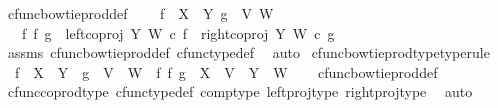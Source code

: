 \begin{isabellebody}
\isanewline
{}\isamarkupfalse%
\ cfunc{\isacharunderscore}{\kern0pt}bowtie{\isacharunderscore}{\kern0pt}prod{\isacharunderscore}{\kern0pt}def{}{\isacharcolon}{\kern0pt}\ \isanewline
\ \ \ {\isachardoublequoteopen}f\ {\isacharcolon}{\kern0pt}\ X\ {\isasymrightarrow}\ Y{\isachardoublequoteclose}\ {\isachardoublequoteopen}g\ {\isacharcolon}{\kern0pt}\ V{\isasymrightarrow}\ W{\isachardoublequoteclose}\isanewline
\ \ \ {\isachardoublequoteopen}f\ {\isasymbowtie}\isactrlsub f\ g\ {\isacharequal}{\kern0pt}\ {\isacharparenleft}{\kern0pt}left{\isacharunderscore}{\kern0pt}coproj\ Y\ W\ {\isasymcirc}\isactrlsub c\ f{\isacharparenright}{\kern0pt}\ {\isasymamalg}\ {\isacharparenleft}{\kern0pt}right{\isacharunderscore}{\kern0pt}coproj\ Y\ W\ {\isasymcirc}\isactrlsub c\ g{\isacharparenright}{\kern0pt}{\isachardoublequoteclose}\isanewline
%
\isadelimproof
\ \ %
\endisadelimproof
%
\isatagproof
{}\isamarkupfalse%
\ assms\ cfunc{\isacharunderscore}{\kern0pt}bowtie{\isacharunderscore}{\kern0pt}prod{\isacharunderscore}{\kern0pt}def\ cfunc{\isacharunderscore}{\kern0pt}type{\isacharunderscore}{\kern0pt}def\ \isamarkupfalse%
\ auto%
\endisatagproof
{\isafoldproof}%
%
\isadelimproof
\isanewline
%
\endisadelimproof
\isanewline
{}\isamarkupfalse%
\ cfunc{\isacharunderscore}{\kern0pt}bowtie{\isacharunderscore}{\kern0pt}prod{\isacharunderscore}{\kern0pt}type{\isacharbrackleft}{\kern0pt}type{\isacharunderscore}{\kern0pt}rule{\isacharbrackright}{\kern0pt}{\isacharcolon}{\kern0pt}\isanewline
\ \ {\isachardoublequoteopen}f\ {\isacharcolon}{\kern0pt}\ X\ {\isasymrightarrow}\ Y\ {\isasymLongrightarrow}\ g\ {\isacharcolon}{\kern0pt}\ V\ {\isasymrightarrow}\ W\ {\isasymLongrightarrow}\ f\ {\isasymbowtie}\isactrlsub f\ g\ {\isacharcolon}{\kern0pt}\ X\ {\isasymCoprod}\ V\ {\isasymrightarrow}\ Y\ {\isasymCoprod}\ W{\isachardoublequoteclose}\isanewline
%
\isadelimproof
\ \ %
\endisadelimproof
%
\isatagproof
{}\isamarkupfalse%
\ cfunc{\isacharunderscore}{\kern0pt}bowtie{\isacharunderscore}{\kern0pt}prod{\isacharunderscore}{\kern0pt}def\isanewline
\ \ \isamarkupfalse%
\ cfunc{\isacharunderscore}{\kern0pt}coprod{\isacharunderscore}{\kern0pt}type\ cfunc{\isacharunderscore}{\kern0pt}type{\isacharunderscore}{\kern0pt}def\ comp{\isacharunderscore}{\kern0pt}type\ left{\isacharunderscore}{\kern0pt}proj{\isacharunderscore}{\kern0pt}type\ right{\isacharunderscore}{\kern0pt}proj{\isacharunderscore}{\kern0pt}type\ \isamarkupfalse%
\ auto%
\endisatagproof

\end{isabellebody}
